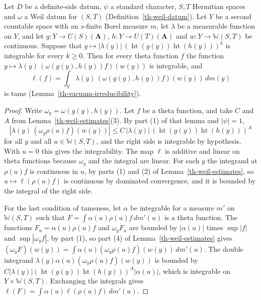 \begin{lemma}\label{th-kernel-tame}
Let $D$ be a definite-side datum, $\psi$ a standard character, $S,T$
Hermitian spaces and $\omega$ a Weil datum for $(S,T)$
(Definition~\ref{th-weil-datum}). Let $Y$ be a second countable space with an
$s$-finite Borel measure $m$, let $\lambda$ be a measurable function on $Y$, and let
$g\colon Y\to U(S)(\mathbf A)$, $h\colon Y\to U(T)(\mathbf A)$ and
$w\colon Y\to\mathbb W(S,T)$ be continuous. Suppose that
$y\mapsto|\lambda(y)|\,(\operatorname{ht}(g(y))\operatorname{ht}(h(y)))^k$ is
integrable for every $k\geq0$. Then for every theta function $f$ the function
$y\mapsto\lambda(y)\,(\omega(g(y),h(y))f)(w(y))$ is integrable, and
\[
\ell(f)=\int_Y\lambda(y)\,(\omega(g(y),h(y))f)(w(y))\,dm(y)
\]
is tame (Lemma~\ref{th-vacuum-irreducibility}).
\end{lemma}
\begin{proof}
Write $\omega_y=\omega(g(y),h(y))$. Let $f$ be a theta function, and take $C$
and $A$ from Lemma~\ref{th-weil-estimates}(3). By part (1) of that lemma and
$|\psi|=1$,
\[
|\lambda(y)\,(\omega_y\rho(u)f)(w(y))|\leq C\,|\lambda(y)|\,(\operatorname{ht}(g(y))\operatorname{ht}(h(y)))^A
\]
for all $y$ and all $u\in\mathbb W(S,T)$, and the right side is integrable by
hypothesis. With $u=0$ this gives the integrability. The map $\ell$ is additive
and linear on theta functions because $\omega_y$ and the integral are linear.
For each $y$ the integrand at $\rho(u)f$ is continuous in $u$, by parts (1)
and (2) of Lemma~\ref{th-weil-estimates}, so $u\mapsto\ell(\rho(u)f)$ is
continuous by dominated convergence, and it is bounded by the integral of the
right side.

For the last condition of tameness, let $\alpha$ be integrable for a measure
$m'$ on $\mathbb W(S,T)$ such that $F=\int\alpha(u)\rho(u)f\,dm'(u)$ is a theta
function. The functions $F_u=\alpha(u)\rho(u)f$ and $\omega_yF_u$ are bounded
by $|\alpha(u)|$ times $\sup|f|$ and $\sup|\omega_yf|$, by part (1), so part (4)
of Lemma~\ref{th-weil-estimates} gives
$(\omega_yF)(w(y))=\int\alpha(u)(\omega_y\rho(u)f)(w(y))\,dm'(u)$. The double
integrand $\lambda(y)\alpha(u)(\omega_y\rho(u)f)(w(y))$ is bounded by
$C|\lambda(y)|(\operatorname{ht}(g(y))\operatorname{ht}(h(y)))^A|\alpha(u)|$, which
is integrable on $Y\times\mathbb W(S,T)$. Exchanging the integrals gives
$\ell(F)=\int\alpha(u)\ell(\rho(u)f)\,dm'(u)$.
\end{proof}

